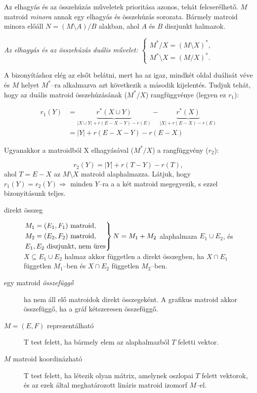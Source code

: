 Az elhagyás és az összehúzás műveletek prioritása azonos, tehát felcserélhető.
$M$ matroid \emph{minora} annak egy elhagyás és összehúzás sorozata. Bármely matroid minora előáll
$N=(M \setminus A) / B$ alakban, ahol $A$ és $B$ diszjunkt halmazok.

\emph{Az elhagyás és az összehúzás duális művelet: $\begin{cases}
M^*/X=(M \setminus X)^*, \\
M^* \setminus X = (M / X)^*.
\end{cases}$}

A bizonyításhoz elég az elsőt belátni, mert ha az igaz, mindkét oldal duálisát
véve és $M$ helyet $M^*$--ra alkalmazva azt következik a második kijelentés.
Tudjuk tehát, hogy az duális matroid összehúzásának ($M^*/X$) rangfüggvénye
(legyen ez $r_1$):

\begin{align*}
r_1(Y) &=\underbrace{r^*(X \cup Y)}_{|X \cup Y| + r(E-X-Y) - r(E)} - 
		 \underbrace{r^*(X)}_{|X| + r(E-X) - r(E)} \\
	   &= |Y| + r(E-X-Y) - r(E-X) 
\end{align*}

Ugyanakkor a matroidból X elhagyásával ($M^*/X$) a rangfüggvény ($r_2$):

\[ r_2(Y) = |Y| + r(T-Y) - r(T),\] ahol $T = E-X$ az $M\setminus X$ matroid
alaphalmazza. Látjuk, hogy $r_1(Y)=r_2(Y)\Rightarrow$ minden $Y$--ra a a két
matroid megegyezik, s ezzel bizonyitásunk teljes.

\begin{description}
  \item[direkt összeg] $\begin{rcases}
  M_1=(E_1,F_1) \mbox{ matroid}, \\
  M_2=(E_2,F_2) \mbox{ matroid}, \\
  E_1, E_2 \mbox{ diszjunkt, nem üres} \end{rcases} N = M_1+ M_2$ alaphalmaza
  $E_1 \cup E_2$, és $X \subseteq E_1 \cup E_2$ halmaz akkor független a direkt
  összegben, ha $X \cap E_1$ független $M_1$--ben és $X \cap E_2$ független
  $M_2$--ben. 
  \item[egy matroid \emph{összefüggő}] ha nem áll elő matroidok direkt
  összegeként. A grafikus matroid akkor összefüggő, ha a gráf kétszeresen
  összefüggő.
  \item[$M=(E,F)$ reprezentálható] T test felett, ha bármely elem az alaphalmazból
  $T$ feletti vektor. 
  \item[$M$ matroid koordinázható]T test felett, ha létezik olyan mátrix, amelynek oszlopai
  $T$ felett vektorok, és az ezek által meghatározott lináris matroid izomorf
  $M$--el.
\end{description}

